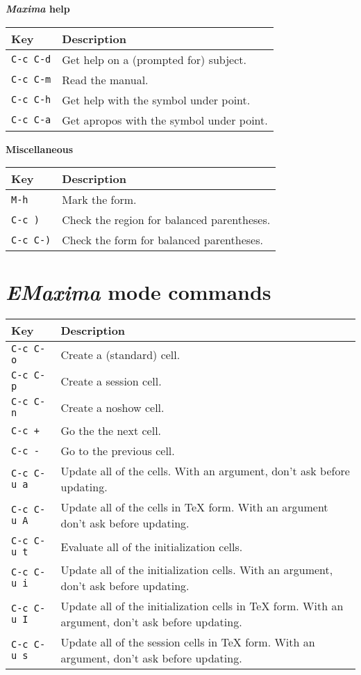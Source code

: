 \documentclass{article}
\newcommand{\emx}{\textsl{\sffamily EMaxima}}
\newcommand{\mx}{\textsl{\sffamily Maxima}}
\begin{document}
\smallskip

\noindent
\textbf{\mx{} help}

\smallskip

\noindent
\begin{tabular}{p{\firstcol}p{\secondcol}}
\hline
\textbf{Key} & \textbf{Description}\\
\hline
\texttt{C-c C-d}
& Get help on a (prompted for) subject.\\
\texttt{C-c C-m}
& Read the manual.\\
\texttt{C-c C-h} & Get help with the symbol under point.\\
\texttt{C-c C-a} & Get apropos with the symbol under point.
\end{tabular}

\smallskip

\noindent
\textbf{Miscellaneous}

\smallskip

\noindent
\begin{tabular}{p{\firstcol}p{\secondcol}}
\hline
\textbf{Key} & \textbf{Description}\\
\hline
\texttt{M-h} & Mark the form.\\
\texttt{C-c )} & Check the region for balanced parentheses.\\
\texttt{C-c C-)} & Check the form for balanced parentheses.
\end{tabular}

\newpage

\section{\emx{} mode commands}
\label{app:emx}

\noindent
\begin{tabular}{p{\firstcol}p{\secondcol}}
\hline
\textbf{Key} & \textbf{Description}\\
\hline
\texttt{C-c C-o} & Create a (standard) cell.\\
\texttt{C-c C-p} & Create a session cell.\\
\texttt{C-c C-n} & Create a noshow cell.\\
\texttt{C-c +} & Go the the next cell.\\
\texttt{C-c -} & Go to the previous cell.\\
\texttt{C-c C-u a} & 
Update all of the cells.  With an argument, don't ask before updating.\\
\texttt{C-c C-u A}
& Update all of the cells in \TeX{} form. With an argument don't ask
before updating.\\
\texttt{C-c C-u t}
& Evaluate all of the initialization cells.\\
\texttt{C-c C-u i}
& Update all of the initialization cells.  With an argument, don't
ask before updating.\\
\texttt{C-c C-u I}
& Update all of the initialization cells in \TeX{} form.  With an
argument, don't ask before updating.\\
\texttt{C-c C-u s}
& Update all of the session cells in \TeX{} form.  With an
argument, don't ask before updating.
\end{tabular}
\end{document}
